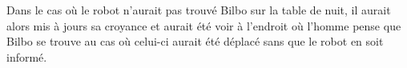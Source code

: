 \documentclass[a4paper,11pt,twoside]{StyleThese}
\begin{document}
Dans le cas où le robot n'aurait pas trouvé Bilbo sur la table de nuit, il aurait alors mis à jours sa croyance et aurait été voir à l'endroit où l'homme pense que Bilbo se trouve au cas où celui-ci aurait été déplacé sans que le robot en soit informé.






\end{document}
